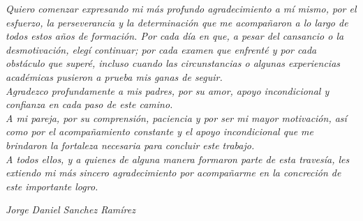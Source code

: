 \thispagestyle{empty}
\null\vfill

\large \textit{
Quiero comenzar expresando mi más profundo agradecimiento a mí mismo, por el esfuerzo, la perseverancia y la determinación que me acompañaron a lo largo de todos estos años de formación. Por cada día en que, a pesar del cansancio o la desmotivación, elegí continuar; por cada examen que enfrenté y por cada obstáculo que superé, incluso cuando las circunstancias o algunas experiencias académicas pusieron a prueba mis ganas de seguir.\\ 
Agradezco profundamente a mis padres, por su amor, apoyo incondicional y confianza en cada paso de este camino.\\ 
A mi pareja, por su comprensión, paciencia y por ser mi mayor motivación, así como por el acompañamiento constante y el apoyo incondicional que me brindaron la fortaleza necesaria para concluir este trabajo.\\ 
A todos ellos, y a quienes de alguna manera formaron parte de esta travesía, les extiendo mi más sincero agradecimiento por acompañarme en la concreción de este importante logro.\\
}
\begin{flushright}
\large \textit{Jorge Daniel Sanchez Ramírez}
\end{flushright}
